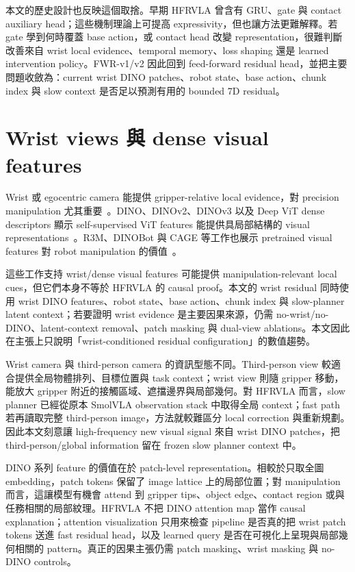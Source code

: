 \documentclass[12pt,a4paper,oneside]{report}
\newcommand{\smolvla}{SmolVLA}
\begin{document}
本文的歷史設計也反映這個取捨。早期 HFRVLA 曾含有 GRU、gate 與 contact auxiliary head；這些機制理論上可提高 expressivity，但也讓方法更難解釋。若 gate 學到何時覆蓋 base action，或 contact head 改變 representation，很難判斷改善來自 wrist local evidence、temporal memory、loss shaping 還是 learned intervention policy。FWR-v1/v2 因此回到 feed-forward residual head，並把主要問題收斂為：current wrist DINO patches、robot state、base action、chunk index 與 slow context 是否足以預測有用的 bounded 7D residual。

\section{Wrist views 與 dense visual features}

Wrist 或 egocentric camera 能提供 gripper-relative local evidence，對 precision manipulation 尤其重要~\citep{jangir2022lookcloser,chuang2024activevision}。DINO、DINOv2、DINOv3 以及 Deep ViT dense descriptors 顯示 self-supervised ViT features 能提供具局部結構的 visual representations~\citep{caron2021dino,oquab2023dinov2,simeoni2025dinov3,amir2021densevit}。R3M、DINOBot 與 CAGE 等工作也展示 pretrained visual features 對 robot manipulation 的價值~\citep{nair2023r3m,dipalo2024dinobot,xia2024cage}。

這些工作支持 wrist/dense visual features 可能提供 manipulation-relevant local cues，但它們本身不等於 HFRVLA 的 causal proof。本文的 wrist residual 同時使用 wrist DINO features、robot state、base action、chunk index 與 slow-planner latent context；若要證明 wrist evidence 是主要因果來源，仍需 no-wrist/no-DINO、latent-context removal、patch masking 與 dual-view ablations。本文因此在主張上只說明「wrist-conditioned residual configuration」的數值趨勢。

Wrist camera 與 third-person camera 的資訊型態不同。Third-person view 較適合提供全局物體排列、目標位置與 task context；wrist view 則隨 gripper 移動，能放大 gripper 附近的接觸區域、遮擋邊界與局部幾何。對 HFRVLA 而言，slow planner 已經從原本 \smolvla{} observation stack 中取得全局 context；fast path 若再讀取完整 third-person image，方法就較難區分 local correction 與重新規劃。因此本文刻意讓 high-frequency new visual signal 來自 wrist DINO patches，把 third-person/global information 留在 frozen slow planner context 中。

DINO 系列 feature 的價值在於 patch-level representation。相較於只取全圖 embedding，patch tokens 保留了 image lattice 上的局部位置；對 manipulation 而言，這讓模型有機會 attend 到 gripper tips、object edge、contact region 或與任務相關的局部紋理。HFRVLA 不把 DINO attention map 當作 causal explanation；attention visualization 只用來檢查 pipeline 是否真的把 wrist patch tokens 送進 fast residual head，以及 learned query 是否在可視化上呈現與局部幾何相關的 pattern。真正的因果主張仍需 patch masking、wrist masking 與 no-DINO controls。
\end{document}
